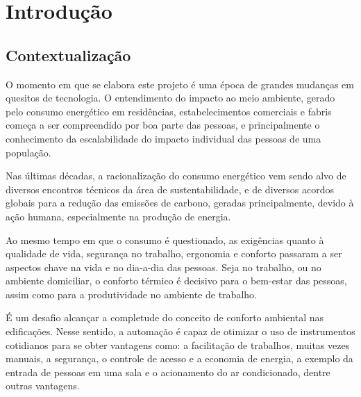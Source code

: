 
\chapter{Introdução}

\label{CapIntro}


\section{Contextualização}

O momento em que se elabora este projeto é uma época de grandes mudanças em quesitos de tecnologia. O entendimento do impacto ao meio ambiente, gerado pelo consumo energético em residências, estabelecimentos comerciais e fabris começa a ser compreendido por boa parte das pessoas, e principalmente o conhecimento da escalabilidade do impacto individual das pessoas de uma população.

Nas últimas décadas, a racionalização do consumo energético vem sendo alvo de diversos encontros técnicos da área de sustentabilidade, e de diversos acordos globais para a redução das emissões de carbono, geradas principalmente, devido à ação humana, especialmente na produção de energia.

Ao mesmo tempo em que o consumo é questionado, as exigências quanto à qualidade de vida, segurança no trabalho, ergonomia e conforto passaram a ser aspectos chave na vida e no dia-a-dia das pessoas. Seja no trabalho, ou no ambiente domiciliar, o conforto térmico é decisivo para o bem-estar das pessoas, assim como para a produtividade no ambiente de trabalho.

É um desafio alcançar a completude do conceito de conforto ambiental nas edificações. Nesse sentido, a automação é capaz de otimizar o uso de instrumentos cotidianos para se obter vantagens como: a facilitação de trabalhos, muitas vezes manuais, a segurança, o controle de acesso e a economia de energia, a exemplo da entrada de pessoas em uma sala e o acionamento do ar condicionado, dentre outras vantagens.


